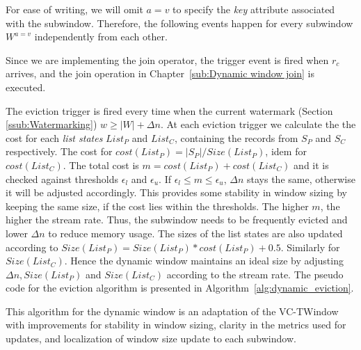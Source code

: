 For ease of writing, we will omit $a=v$ to specify the \emph{key} attribute associated 
with the subwindow. 
Therefore, the following events happen for every subwindow $W^{a=v}$ independently from 
each other. 

Since we are implementing the join operator, the trigger event is fired when  
$r_c$ arrives, and the join operation in Chapter~\ref{sub:Dynamic window join} is 
executed. 


The eviction trigger is fired every time when the current watermark (Section \ref{ssub:Watermarking}) 
$w \ge |W| + \Delta n$. At each eviction trigger we calculate the 
the cost for each \emph{list states} $List_P$ and $List_C$, containing the records from $S_P$ and $S_C$
respectively. The cost for $cost(List_P) = |S_P|/Size(List_P)$, idem for $cost(List_C)$. 
The total cost is $m = cost(List_P) + cost(List_C)$ and it is checked against thresholds $\epsilon_l$ and $\epsilon_u$. If  $\epsilon_l \le m \le \epsilon_u$, 
$\Delta n$ stays the same, otherwise it will be adjusted accordingly. This provides some stability 
in window sizing by keeping the same size, if the cost lies within the thresholds. 
The higher $m$, the higher the stream rate. Thus, the subwindow needs to be frequently 
evicted and lower $\Delta n$ to reduce memory usage. 
The sizes of the list states 
are also updated according to $Size(List_P) = Size(List_P) * cost(List_P) + 0.5$.
Similarly for $Size(List_C)$. 
Hence the dynamic window maintains an 
ideal size by adjusting $\Delta n, Size(List_P)$ and $Size(List_C)$ according to 
the stream rate. The pseudo code for the eviction algorithm is presented in Algorithm~\ref{alg:dynamic_eviction}.

This algorithm for the dynamic window is an adaptation of the VC-TWindow~\cite{vctw_join} with 
improvements for stability in window sizing, clarity in the metrics used for updates, and localization 
of window size update to each subwindow.  

